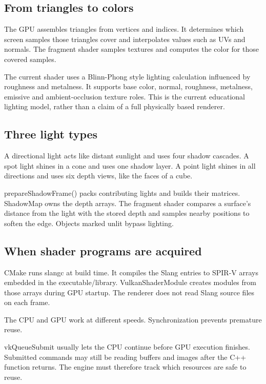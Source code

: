 \documentclass[11pt,a4paper]{article}
\begin{document}
\subsection*{From triangles to colors}
The GPU assembles triangles from vertices and indices. It determines which screen samples those triangles cover and interpolates values such as UVs and normals. The fragment shader samples textures and computes the color for those covered samples.

The current shader uses a Blinn-Phong style lighting calculation influenced by roughness and metalness. It supports base color, normal, roughness, metalness, emissive and ambient-occlusion texture roles. This is the current educational lighting model, rather than a claim of a full physically based renderer.

\subsection*{Three light types}
A directional light acts like distant sunlight and uses four shadow cascades. A spot light shines in a cone and uses one shadow layer. A point light shines in all directions and uses six depth views, like the faces of a cube.

prepareShadowFrame() packs contributing lights and builds their matrices. ShadowMap owns the depth arrays. The fragment shader compares a surface's distance from the light with the stored depth and samples nearby positions to soften the edge. Objects marked unlit bypass lighting.

\subsection*{When shader programs are acquired}
CMake runs slangc at build time. It compiles the Slang entries to SPIR-V arrays embedded in the executable/library. VulkanShaderModule creates modules from those arrays during GPU startup. The renderer does not read Slang source files on each frame.

\label{core-41}
The CPU and GPU work at different speeds. Synchronization prevents premature reuse.

vkQueueSubmit usually lets the CPU continue before GPU execution finishes. Submitted commands may still be reading buffers and images after the C++ function returns. The engine must therefore track which resources are safe to reuse.
\end{document}
